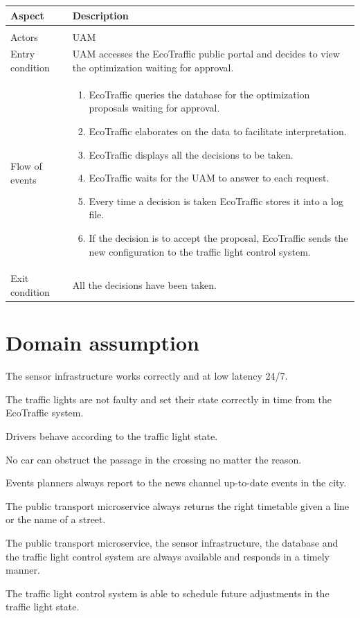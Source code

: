 \documentclass[12pt, a4paper, twoside, openright]{report}
\begin{document}
\begin{longtable}{>{\raggedright\arraybackslash}p{} >{\raggedright\arraybackslash}p{}}
\toprule
\textbf{Aspect} & \textbf{Description} \\
\midrule
\endhead
\midrule
\multicolumn{2}{r}{\textit{Continues on next page}} \\
\endfoot
\bottomrule
\endlastfoot

Actors & UAM \\
Entry condition & UAM accesses the EcoTraffic public portal and decides to view the optimization waiting for approval. \\
Flow of events &
\begin{enumerate}
  \item EcoTraffic queries the database for the optimization proposals waiting for approval.
  \item EcoTraffic elaborates on the data to facilitate interpretation.
  \item EcoTraffic displays all the decisions to be taken.
  \item EcoTraffic waits for the UAM to answer to each request.
  \item Every time a decision is taken EcoTraffic stores it into a log file.
  \item If the decision is to accept the proposal, EcoTraffic sends the new configuration to the traffic light control system.
\end{enumerate}
\\
Exit condition & All the decisions have been taken. \\
\end{longtable}

\section{Domain assumption}
\begin{domain_assumption}
\item
  The sensor infrastructure works correctly and at low latency 24/7.
\item
  The traffic lights are not faulty and set their state correctly in
  time from the EcoTraffic system.
\item
  Drivers behave according to the traffic light state.
\item
  No car can obstruct the passage in the crossing no matter the reason.
\item
  Events planners always report to the news channel up-to-date events in
  the city.
\item
  The public transport microservice always returns the right timetable
  given a line or the name of a street.
\item
  The public transport microservice, the sensor infrastructure, the database and the traffic light control system 
  are always available and responds in a timely manner.
\item
  The traffic light control system is able to schedule future adjustments in the traffic light state.

\end{domain_assumption}
\end{document}

